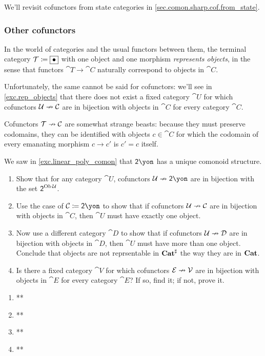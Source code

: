 \documentclass[Book-Poly]{subfiles}
\begin{document}
We'll revisit cofunctors from state categories in \cref{sec.comon.sharp.cof.from_state}.

\subsubsection{Other cofunctors}

\begin{example}\label{ex.rep_objects}
In the world of categories and the usual functors between them, the terminal category $\mathcal{T}\coloneqq\fbox{$\bullet$}$ with one object and one morphism \emph{represents objects}, in the sense that functors $\cat{T}\to\cat{C}$ naturally correspond to objects in $\cat{C}$.

Unfortunately, the same cannot be said for cofunctors: we'll see in \cref{exc.rep_objects} that there does not exist a fixed category $\cat{U}$ for which cofunctors $\mathcal{U}\nrightarrow\mathcal{C}$ are in bijection with objects in $\cat{C}$ for every category $\cat{C}$.

Cofunctors $\mathcal{T}\nrightarrow\mathcal{C}$ are somewhat strange beasts: because they must preserve codomains, they can be identified with objects $c\in\cat{C}$ for which the codomain of every emanating morphism $c\to c'$ is $c'=c$ itself. %
\end{example}

\begin{exercise}\label{exc.rep_objects}
We saw in \cref{exc.linear_poly_comon} that $\2\yon$ has a unique comonoid structure.
\begin{enumerate}
	\item Show that for any category $\cat{U}$, cofunctors $\cat{U}\cof\2\yon$ are in bijection with the set $\textsf{2}^{\operatorname{Ob}\mathcal{U}}$.
	\item Use the case of $\cat{C}\coloneqq\2\yon$ to show that if cofunctors $\mathcal{U}\nrightarrow\mathcal{C}$ are in bijection with objects in $\cat{C}$, then $\cat{U}$ must have exactly one object.
	\item Now use a different category $\cat{D}$ to show that if cofunctors $\mathcal{U}\nrightarrow\mathcal{D}$ are in bijection with objects in $\cat{D}$, then $\cat{U}$ must have more than one object.
	Conclude that objects are not reprsentable in $\mathbf{Cat}^\sharp$ the way they are in $\mathbf{Cat}$.
	\item Is there a fixed category $\cat{V}$ for which cofunctors $\mathcal{E}\nrightarrow\mathcal{V}$ are in bijection with objects in $\cat{E}$ for every category $\cat{E}$?
	If so, find it; if not, prove it.
\qedhere
\end{enumerate}
\begin{solution}
\begin{enumerate}
    \item **
    \item **
    \item **
    \item **
\end{enumerate}
\end{solution}
\end{exercise}
\end{document}
